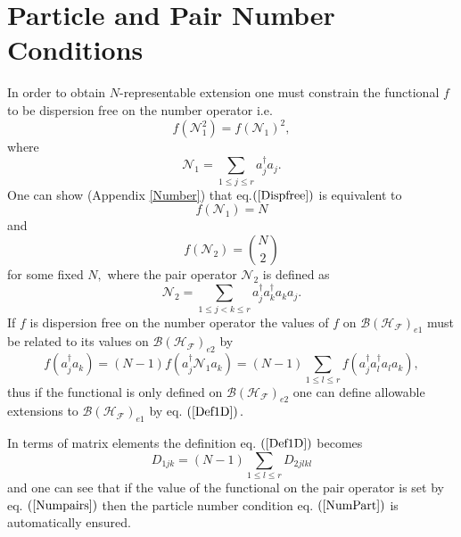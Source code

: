 \documentclass[aps,preprint]{revtex4}%
\begin{document}
\section{Particle and Pair Number Conditions \label{PartPair}}

In order to obtain $N$-representable extension one must constrain the
functional $f$ to be dispersion free on the number operator i.e.
\begin{equation}
f\left(  \mathcal{N}_{1}^{2}\right)  =f\left(  \mathcal{N}_{1}\right)  ^{2},
\label{Dispfree}%
\end{equation}
where
\begin{equation}
\mathcal{N}_{1}=\sum_{1\leq j\leq r}a_{j}^{\dagger}a_{j}.
\end{equation}
One can show (Appendix \ref{Number}) that eq.$\left(  \ref{Dispfree}\right)  $
is equivalent to
\begin{equation}
f\left(  \mathcal{N}_{1}\right)  =N \label{NumPart}%
\end{equation}
and
\begin{equation}
f\left(  \mathcal{N}_{2}\right)  =\binom{N}{2} \label{Numpairs}%
\end{equation}
for some fixed $N,$ where the pair operator $\mathcal{N}_{2}$ is defined as
\begin{equation}
\mathcal{N}_{2}=\sum_{1\leq j<k\leq r}a_{j}^{\dagger}a_{k}^{\dagger}a_{k}%
a_{j}.
\end{equation}
If $f$ is dispersion free on the number operator the values of $f$ on
$\mathcal{B}\left(  \mathcal{H}_{\mathcal{F}}\right)  _{e1}$ must be related
to its values on $\mathcal{B}\left(  \mathcal{H}_{\mathcal{F}}\right)  _{e2}$
by
\begin{equation}
f\left(  a_{j}^{\dagger}a_{k}\right)  =\left(  N-1\right)  f\left(
a_{j}^{\dagger}\mathcal{N}_{1}a_{k}\right)  =\left(  N-1\right)  \sum_{1\leq
l\leq r}f\left(  a_{j}^{\dagger}a_{l}^{\dagger}a_{l}a_{k}\right)  ,
\label{Def1D}%
\end{equation}
thus if the functional is only defined on $\mathcal{B}\left(  \mathcal{H}%
_{\mathcal{F}}\right)  _{e2}$ one can define allowable extensions to
$\mathcal{B}\left(  \mathcal{H}_{\mathcal{F}}\right)  _{e1}$ by eq. $\left(
\ref{Def1D}\right)  .$

In terms of matrix elements the definition eq. $\left(  \ref{Def1D}\right)  $
becomes
\begin{equation}
D_{1jk}=\left(  N-1\right)  \sum_{1\leq l\leq r}D_{2jlkl}%
\end{equation}
and one can see that if the value of the functional on the pair operator is
set by eq. $\left(  \ref{Numpairs}\right)  $ then the particle number
condition eq. $\left(  \ref{NumPart}\right)  $ is automatically ensured.
\end{document}
